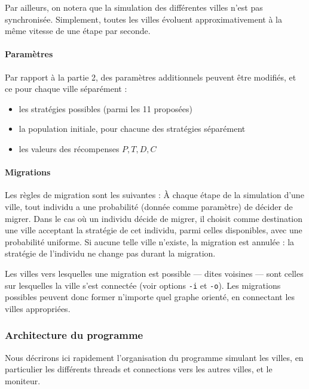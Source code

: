 \documentclass[10pt]{article}
\begin{document}
Par ailleurs, on notera que la simulation des différentes villes n'est pas synchronisée. 
Simplement, toutes les villes évoluent approximativement à la même vitesse de une étape par seconde.

\paragraph{Paramètres}
Par rapport à la partie 2, des paramètres additionnels peuvent être modifiés, et ce pour chaque ville séparément :
\begin{itemize}
\item les stratégies possibles (parmi les 11 proposées)
\item la population initiale, pour chacune des stratégies séparément
\item les valeurs des récompenses $P,T,D,C$
\end{itemize}

\paragraph{Migrations}
Les règles de migration sont les suivantes :
À chaque étape de la simulation d'une ville, tout individu a une probabilité (donnée comme paramètre) de décider de migrer.
Dans le cas où un individu décide de migrer, il choisit comme destination une ville acceptant la stratégie de cet individu, parmi celles disponibles,
avec une probabilité uniforme. Si aucune telle ville n'existe, la migration est annulée : la stratégie de l'individu ne change pas
durant la migration.

Les villes vers lesquelles une migration est possible --- dites voisines --- sont celles sur lesquelles la ville s'est connectée
(voir options \verb|-i| et \verb|-o|). Les migrations possibles peuvent donc former n'importe quel graphe orienté, en connectant
les villes appropriées.

\subsubsection{Architecture du programme}
Nous décrirons ici rapidement l'organisation du programme simulant les villes,
en particulier les différents threads et connections vers les autres villes, et le moniteur.

\paragraph{}


\clearpage
\appendix
\end{document}
